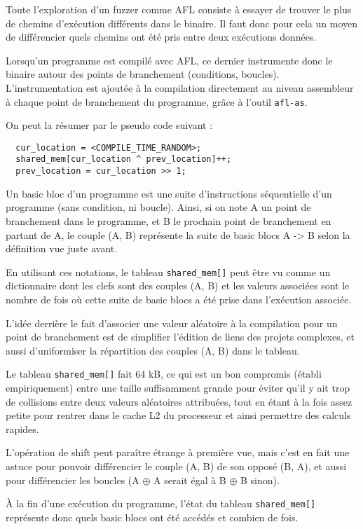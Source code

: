 Toute l'exploration d'un fuzzer comme AFL consiste à  essayer de trouver le
plus de chemins d'exécution différents dans le binaire.
Il faut donc pour cela un moyen de différencier quels chemins ont été pris
entre deux exécutions données.

Lorsqu'un programme est compilé avec AFL, ce dernier instrumente donc le
binaire autour des points de branchement (conditions, boucles).
L'instrumentation est ajoutée à la compilation directement au niveau
assembleur à chaque point de branchement du programme, grâce à l'outil
\lstinline{afl-as}.

On peut la résumer par le pseudo code suivant :

\begin{lstlisting}
  cur_location = <COMPILE_TIME_RANDOM>;
  shared_mem[cur_location ^ prev_location]++;
  prev_location = cur_location >> 1;
\end{lstlisting}

Un basic bloc d'un programme est une suite d'instructions séquentielle d'un
programme (sans condition, ni boucle). Ainsi, si on note A un point de
branchement dans le programme, et B le prochain point de branchement en
partant de A, le couple (A, B) représente la suite de basic blocs A -> B
selon la définition vue juste avant.

En utilisant ces notations, le tableau \lstinline{shared_mem[]} peut être vu
comme un dictionnaire dont les clefs sont des couples (A, B) et les valeurs
associées sont le nombre de fois où cette suite de basic blocs a été prise dans
l'exécution associée.

L'idée derrière le fait d'associer une valeur aléatoire à la compilation
pour un point de branchement est de simplifier l'édition de liens des
projets complexes, et aussi d'uniformiser la répartition des couples
(A, B) dans le tableau.

Le tableau \lstinline{shared_mem[]} fait 64 kB, ce qui est un bon compromis
(établi empiriquement) entre une taille suffisamment grande pour éviter qu'il y
ait trop de collisions entre deux valeurs aléatoires attribuées, tout en
étant à la fois assez petite pour rentrer dans le cache L2 du processeur
et ainsi permettre des calculs rapides.

L'opération de shift peut paraître étrange à première vue, mais c'est en
fait une astuce pour pouvoir différencier le couple (A, B) de
son opposé (B, A), et aussi pour différencier les boucles
(A $\oplus$ A serait égal à B $\oplus$ B sinon).

À la fin d'une exécution du programme, l'état du tableau
\lstinline{shared_mem[]} représente donc quels basic blocs ont été accédés
et combien de fois.

